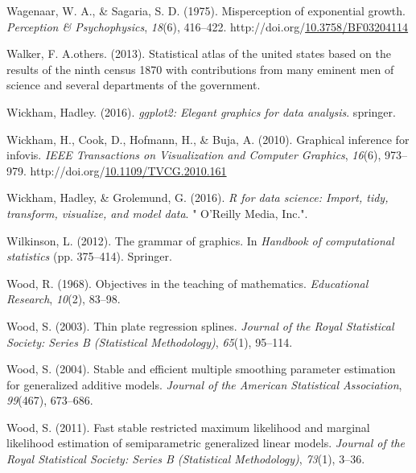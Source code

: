 \documentclass[print]{nuthesis}
\newlength{\cslhangindent}
\newenvironment{CSLReferences}[2]%
{\setlength{\parindent}{0pt}%
\everypar{\setlength{\hangindent}{\cslhangindent}}\ignorespaces}%
{\par}
\begin{document}
\begin{CSLReferences}{1}{0}
\leavevmode{}%
Wagenaar, W. A., \& Sagaria, S. D. (1975). Misperception of exponential growth. \emph{Perception \& Psychophysics}, \emph{18}(6), 416--422. http://doi.org/\href{https://doi.org/10.3758/BF03204114}{10.3758/BF03204114}

\leavevmode{}%
Walker, F. A.others. (2013). Statistical atlas of the united states based on the results of the ninth census 1870 with contributions from many eminent men of science and several departments of the government.

\leavevmode{}%
Wickham, Hadley. (2016). \emph{ggplot2: Elegant graphics for data analysis}. springer.

\leavevmode{}%
Wickham, H., Cook, D., Hofmann, H., \& Buja, A. (2010). Graphical inference for infovis. \emph{IEEE Transactions on Visualization and Computer Graphics}, \emph{16}(6), 973--979. http://doi.org/\href{https://doi.org/10.1109/TVCG.2010.161}{10.1109/TVCG.2010.161}

\leavevmode{}%
Wickham, Hadley, \& Grolemund, G. (2016). \emph{R for data science: Import, tidy, transform, visualize, and model data}. " O'Reilly Media, Inc.".

\leavevmode{}%
Wilkinson, L. (2012). The grammar of graphics. In \emph{Handbook of computational statistics} (pp. 375--414). Springer.

\leavevmode{}%
Wood, R. (1968). Objectives in the teaching of mathematics. \emph{Educational Research}, \emph{10}(2), 83--98.

\leavevmode{}%
Wood, S. (2003). Thin plate regression splines. \emph{Journal of the Royal Statistical Society: Series B (Statistical Methodology)}, \emph{65}(1), 95--114.

\leavevmode{}%
Wood, S. (2004). Stable and efficient multiple smoothing parameter estimation for generalized additive models. \emph{Journal of the American Statistical Association}, \emph{99}(467), 673--686.

\leavevmode{}%
Wood, S. (2011). Fast stable restricted maximum likelihood and marginal likelihood estimation of semiparametric generalized linear models. \emph{Journal of the Royal Statistical Society: Series B (Statistical Methodology)}, \emph{73}(1), 3--36.


\end{CSLReferences}
\end{document}
